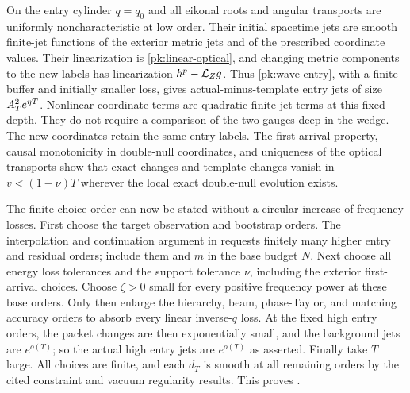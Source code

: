 On the entry cylinder $q=q_0$ and all eikonal roots and angular
transports are uniformly noncharacteristic at low order. Their
initial spacetime jets are smooth finite-jet functions of the
exterior metric jets and of the prescribed coordinate values.
Their linearization is \eqref{pk:linear-optical}, and changing
metric components to the new labels has linearization
$h^p-\mathcal L_Zg$. Thus \eqref{pk:wave-entry}, with a finite buffer
and initially smaller loss, gives actual-minus-template entry
jets of size $A_T^2e^{\eta T}$. Nonlinear coordinate terms are
quadratic finite-jet terms at this fixed depth. They do not
require a comparison of the two gauges deep in the wedge.
The new coordinates retain the same entry labels. The first-arrival
property, causal monotonicity in double-null coordinates, and
uniqueness of the optical transports show that exact changes and
template changes vanish in $v<(1-\nu)T$ wherever the local exact
double-null evolution exists.

The finite choice order can now be stated without a circular
increase of frequency losses. First choose the target observation
and bootstrap orders. The interpolation and continuation argument
in  requests finitely many higher entry and
residual orders; include them and $m$ in the base budget $N$.
Next choose all energy loss tolerances and the support tolerance
$\nu$, including the exterior first-arrival choices. Choose
$\zeta>0$ small for every positive frequency power at these base
orders. Only then enlarge the hierarchy, beam, phase-Taylor, and
matching accuracy orders to absorb every linear inverse-$q$ loss.
At the fixed high entry orders, the packet changes are then
exponentially small, and the background jets are $e^{o(T)}$;
so the actual high entry jets are $e^{o(T)}$ as asserted. Finally
take $T$ large. All choices are finite, and each $d_T$ is smooth
at all remaining orders by the cited constraint and vacuum
regularity results. This proves .
